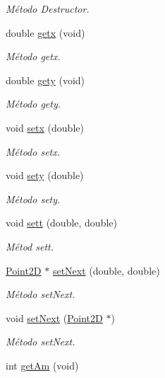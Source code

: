 \begin{DoxyCompactItemize}
\begin{DoxyCompactList}\small\item\em Método Destructor. \end{DoxyCompactList}\item 
double \hyperlink{class_point2_d_abe2430aa7078f09496b538da52ef35cb}{getx} (void)
\begin{DoxyCompactList}\small\item\em Método getx. \end{DoxyCompactList}\item 
double \hyperlink{class_point2_d_ab01bf498063e4a6d29fbcff95b06e092}{gety} (void)
\begin{DoxyCompactList}\small\item\em Método gety. \end{DoxyCompactList}\item 
void \hyperlink{class_point2_d_a36d1b973b13ebf9c634d369119ca8c2e}{setx} (double)
\begin{DoxyCompactList}\small\item\em Método setx. \end{DoxyCompactList}\item 
void \hyperlink{class_point2_d_ae60a82352ce1f39527a97fcd941fa9bc}{sety} (double)
\begin{DoxyCompactList}\small\item\em Método sety. \end{DoxyCompactList}\item 
void \hyperlink{class_point2_d_a0f372c747ea163de8e73029d58de1b74}{sett} (double, double)
\begin{DoxyCompactList}\small\item\em Métod sett. \end{DoxyCompactList}\item 
\hyperlink{class_point2_d}{Point2\-D} $\ast$ \hyperlink{class_point2_d_a01d0b82b5295101ff4a17debb9a46b57}{set\-Next} (double, double)
\begin{DoxyCompactList}\small\item\em Método set\-Next. \end{DoxyCompactList}\item 
void \hyperlink{class_point2_d_ab194d1868b4931ea7e2615151477df87}{set\-Next} (\hyperlink{class_point2_d}{Point2\-D} $\ast$)
\begin{DoxyCompactList}\small\item\em Método set\-Next. \end{DoxyCompactList}\item 
int \hyperlink{class_point2_d_ad58676dabebce9c9f48dd143c098e14a}{get\-Am} (void)

\end{DoxyCompactItemize}
